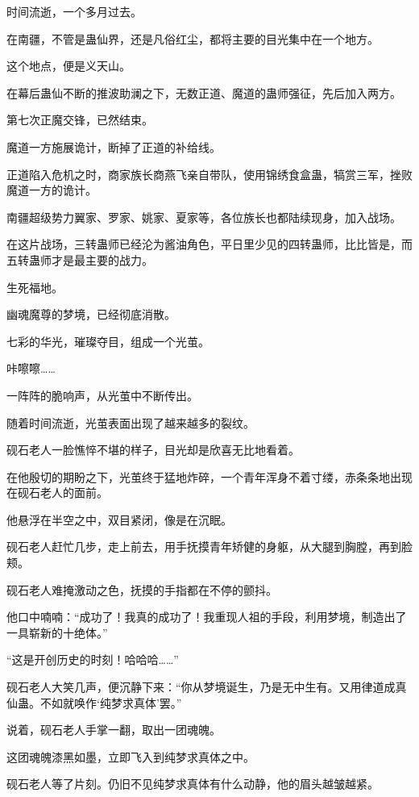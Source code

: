 
\begin{this_body}

时间流逝，一个多月过去。

在南疆，不管是蛊仙界，还是凡俗红尘，都将主要的目光集中在一个地方。

这个地点，便是义天山。

在幕后蛊仙不断的推波助澜之下，无数正道、魔道的蛊师强征，先后加入两方。

第七次正魔交锋，已然结束。

魔道一方施展诡计，断掉了正道的补给线。

正道陷入危机之时，商家族长商燕飞亲自带队，使用锦绣食盒蛊，犒赏三军，挫败魔道一方的诡计。

南疆超级势力翼家、罗家、姚家、夏家等，各位族长也都陆续现身，加入战场。

在这片战场，三转蛊师已经沦为酱油角色，平日里少见的四转蛊师，比比皆是，而五转蛊师才是最主要的战力。

生死福地。

幽魂魔尊的梦境，已经彻底消散。

七彩的华光，璀璨夺目，组成一个光茧。

咔嚓嚓……

一阵阵的脆响声，从光茧中不断传出。

随着时间流逝，光茧表面出现了越来越多的裂纹。

砚石老人一脸憔悴不堪的样子，目光却是欣喜无比地看着。

在他殷切的期盼之下，光茧终于猛地炸碎，一个青年浑身不着寸缕，赤条条地出现在砚石老人的面前。

他悬浮在半空之中，双目紧闭，像是在沉眠。

砚石老人赶忙几步，走上前去，用手抚摸青年矫健的身躯，从大腿到胸膛，再到脸颊。

砚石老人难掩激动之色，抚摸的手指都在不停的颤抖。

他口中喃喃：“成功了！我真的成功了！我重现人祖的手段，利用梦境，制造出了一具崭新的十绝体。”

“这是开创历史的时刻！哈哈哈……”

砚石老人大笑几声，便沉静下来：“你从梦境诞生，乃是无中生有。又用律道成真仙蛊。不如就唤作‘纯梦求真体’罢。”

说着，砚石老人手掌一翻，取出一团魂魄。

这团魂魄漆黑如墨，立即飞入到纯梦求真体之中。

砚石老人等了片刻。仍旧不见纯梦求真体有什么动静，他的眉头越皱越紧。


\end{this_body}

